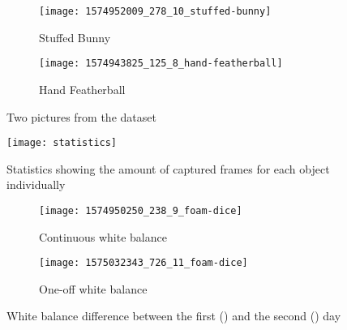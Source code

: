 \begin{figure}[hb]
  \centering
  \begin{subfigure}[b]{0.45\textwidth}
    \centering
    \texttt{[image: 1574952009\_278\_10\_stuffed-bunny]}
    \caption{Stuffed Bunny}
    \label{subfig:stuffed_bunny}
  \end{subfigure}
  \begin{subfigure}[b]{0.45\textwidth}
    \centering
    \texttt{[image: 1574943825\_125\_8\_hand-featherball]}
    \caption{Hand Featherball}
    \label{subfig:hand_featherball}
  \end{subfigure}
  \caption{Two pictures from the dataset}
  \label{fig:dataset}
\end{figure}

\begin{figure}[h]
  \centering
  \texttt{[image: statistics]}
  \caption{Statistics showing the amount of captured frames for each object individually}
  \label{fig:statistics}
\end{figure}

\begin{figure}[h]
  \centering
  \begin{subfigure}[b]{0.45\textwidth}
    \centering
    \texttt{[image: 1574950250\_238\_9\_foam-dice]}
    \caption{Continuous white balance}
    \label{subfig:foam_dice_first_day}
  \end{subfigure}
  \begin{subfigure}[b]{0.45\textwidth}
    \centering
    \texttt{[image: 1575032343\_726\_11\_foam-dice]}
    \caption{One-off white balance}
    \label{subfig:foam_dice_second_day}
  \end{subfigure}
  \caption{White balance difference between the first () and the second () day}
  \label{fig:dataset_white_balance}
\end{figure}
